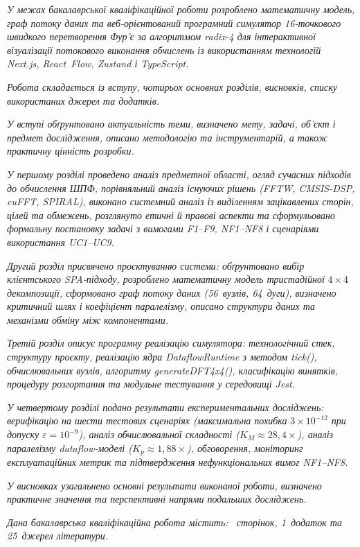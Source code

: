 \emph{У межах бакалаврської кваліфікаційної роботи розроблено
математичну модель, граф потоку даних та веб-орієнтований програмний
симулятор 16-точкового швидкого перетворення Фур'є за алгоритмом radix-4
для інтерактивної візуалізації потокового виконання обчислень із
використанням технологій Next.js, React~Flow, Zustand і TypeScript.}

\emph{Робота складається із вступу, чотирьох основних розділів,
висновків, списку використаних джерел та додатків.}

\emph{У вступі обґрунтовано актуальність теми, визначено мету, задачі,
об'єкт і предмет дослідження, описано методологію та інструментарій, а
також практичну цінність розробки.}

\emph{У першому розділі проведено аналіз предметної області, огляд
сучасних підходів до обчислення ШПФ, порівняльний аналіз існуючих рішень
(FFTW, CMSIS-DSP, cuFFT, SPIRAL), виконано системний аналіз із
виділенням зацікавлених сторін, цілей та обмежень, розглянуто етичні й
правові аспекти та сформульовано формальну постановку задачі з вимогами
F1--F9, NF1--NF8 і сценаріями використання UC1--UC9.}

\emph{Другий розділ присвячено проєктуванню системи: обґрунтовано вибір
клієнтського SPA-підходу, розроблено математичну модель тристадійної}
\(4 \times 4\) \emph{декомпозиції, сформовано граф потоку даних
(56~вузлів, 64~дуги), визначено критичний шлях і коефіцієнт паралелізму,
описано структури даних та механізми обміну між компонентами.}

\emph{Третій розділ описує програмну реалізацію симулятора:
технологічний стек, структуру проєкту, реалізацію ядра DataflowRuntime з
методом tick(), обчислювальних вузлів, алгоритму generateDFT4x4(),
класифікацію винятків, процедуру розгортання та модульне тестування у
середовищі Jest.}

\emph{У четвертому розділі подано результати експериментальних
досліджень: верифікацію на шести тестових сценаріях (максимальна
похибка} \(3 \times 10^{- 12}\) \emph{при допуску}
\(\varepsilon = 10^{- 9}\)\emph{), аналіз обчислювальної складності
(}\(K_{M} \approx 28,4 \times\)\emph{), аналіз паралелізму
dataflow-моделі (}\(K_{p} \approx 1,88 \times\)\emph{), обговорення,
моніторинг експлуатаційних метрик та підтвердження нефункціональних
вимог NF1--NF8.}

\emph{У висновках узагальнено основні результати виконаної роботи,
визначено практичне значення та перспективні напрями подальших
досліджень.}

\emph{Дана бакалаврська кваліфікаційна робота містить: ~сторінок,
1~додаток та 25~джерел літератури.}

